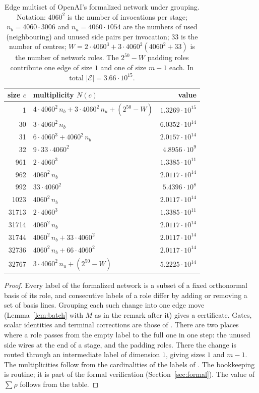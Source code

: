 \documentclass[11pt]{article}
\theoremstyle{definition}
\theoremstyle{remark}
\newcommand{\E}{\mathcal{E}}
\begin{document}
\begin{table}[h]
\centering\small
\begin{tabular}{@{}rlr@{}}
\toprule
size $c$ & multiplicity $N(c)$ & value\\
\midrule
1 & $4\cdot4060^2\,n_b+3\cdot4060^2\,n_u+(2^{50}-W)$ & $1.3269\cdot10^{15}$\\
30 & $3\cdot4060^2\,n_b$ & $6.0352\cdot10^{14}$\\
31 & $6\cdot4060^3+4060^2\,n_b$ & $2.0157\cdot10^{14}$\\
32 & $9\cdot33\cdot4060^2$ & $4.8956\cdot10^{9}$\\
961 & $2\cdot4060^3$ & $1.3385\cdot10^{11}$\\
962 & $4060^2\,n_b$ & $2.0117\cdot10^{14}$\\
992 & $33\cdot4060^2$ & $5.4396\cdot10^{8}$\\
1023 & $4060^2\,n_b$ & $2.0117\cdot10^{14}$\\
31713 & $2\cdot4060^3$ & $1.3385\cdot10^{11}$\\
31714 & $4060^2\,n_b$ & $2.0117\cdot10^{14}$\\
31744 & $4060^2\,n_b+33\cdot4060^2$ & $2.0117\cdot10^{14}$\\
32736 & $4060^2\,n_b+66\cdot4060^2$ & $2.0117\cdot10^{14}$\\
32767 & $3\cdot4060^2\,n_u+(2^{50}-W)$ & $5.2225\cdot10^{14}$\\
\bottomrule
\end{tabular}
\caption{Edge multiset of OpenAI's formalized network under grouping. Notation: $4060^2$ is the number
of invocations per stage; $n_b=4060\cdot3006$ and $n_u=4060\cdot1054$ are the numbers of used
(neighbouring) and unused side pairs per invocation; $33$ is the number of centres;
$W=2\cdot4060^3+3\cdot4060^2(4060^2+33)$ is the number of network roles. The $2^{50}-W$ padding roles
contribute one edge of size $1$ and one of size $m-1$ each. In total $|\E|=3.66\cdot10^{15}$.}
\label{tab:hist}
\end{table}

\begin{proof}
Every label of the formalized network is a subset of a fixed orthonormal basis of its role, and
consecutive labels of a role differ by adding or removing a set of basis lines. Grouping each such
change into one edge move (Lemma~\ref{lem:batch} with $M$ as in the remark after it) gives a certificate.
Gates, scalar identities and terminal corrections are those of \cite{oailean}. There are two places
where a role passes from the empty label to the full one in one step: the unused side wires at the
end of a stage, and the padding roles. There the change is routed through an intermediate label of
dimension $1$, giving sizes $1$ and $m-1$. The multiplicities follow from the cardinalities of the
labels of \cite{oailean}. The bookkeeping is routine; it is part of the formal verification
(Section~\ref{sec:formal}). The value of $\sum\rho$ follows from the table.
\end{proof}
\end{document}
